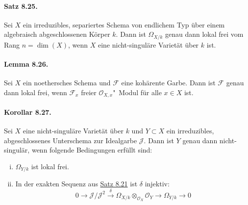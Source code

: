 \paragraph{Satz 8.25.}\label{8.25} Sei $X$ ein irreduzibles, separiertes Schema von endlichem Typ über einem algebraisch abgeschlossenen Körper $k$. Dann ist $\Omega_{X/k}$ genau dann lokal frei vom Rang $n=\dim(X)$, wenn $X$ eine nicht-singuläre Varietät über $k$ ist.

\iffalse
\paragraph{Beweis.} Sei $x\in X$ ein abgeschlossener Punkt. Dann ist $\dim(\mathcal{O}_{X,x})=n$ und $\kappa(x)=k$. Es ist $B=\mathcal{O}_{X,x}$ eine endlich erzeugte $k$"~Algebra und $\Omega_{B/k}=(\Omega_{X/k})_x$. Nach \hyperref[8.15]{Satz 8.15} ist $(\Omega_{X/k})_x$ genau dann frei vom Rang $n$, wenn $\mathcal{O}_{X,x}$ regulär ist. Somit haben wir mit \hyperref[8.26]{Lemma 8.26} folgende Äquivalenzen:
\begin{align*}
& \text{Alle lokalen Ringe sind regulär}\\
\iff & \text{Alle lokalen Ringe von abgeschlossenen Punkten sind regulär}\\
\iff & (\Omega_{X/k})_x \text{ ist frei vom Rang $n$ für alle abgeschlossene $x\in X$}\\
\iff & \Omega_{X/k}\text{ ist lokal frei vom Rang $n$}\qedhere
\end{align*}
\fi

\paragraph{Lemma 8.26.}\label{8.26} Sei $X$ ein noethersches Schema und $\mathcal{F}$ eine kohärente Garbe. Dann ist $\mathcal{F}$ genau dann lokal frei, wenn $\mathcal{F}_x$ freier $\mathcal{O}_{X,x}$"~Modul für alle $x\in X$ ist.

\paragraph{Korollar 8.27.}\label{8.27} Sei $X$ eine nicht-singuläre Varietät über $k$ und $Y\subset X$ ein irreduzibles, abgeschlossenes Unterschema zur Idealgarbe $\mathcal{J}$. Dann ist $Y$ genau dann nicht-singulär, wenn folgende Bedingungen erfüllt sind:
\begin{enumerate}[(i)]
\item $\Omega_{Y/k}$ ist lokal frei.
\item In der exakten Sequenz aus \hyperref[8.21]{Satz 8.21} ist $\delta$ injektiv:
\[0\longrightarrow\mathcal{J}/\mathcal{J}^2\stackrel{\delta}{\longrightarrow}\Omega_{X/k}\otimes_{\mathcal{O}_X}\mathcal{O}_Y\longrightarrow\Omega_{Y/k}\longrightarrow 0 \]
\end{enumerate}
